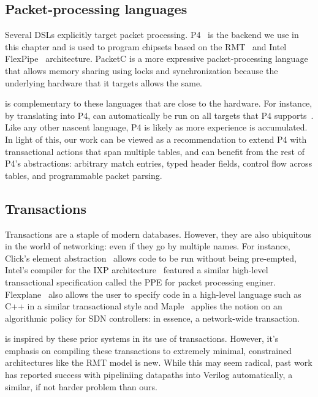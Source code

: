 \subsection{Packet-processing languages}
Several DSLs explicitly target packet processing. P4~\cite{p4} is the backend
we use in this chapter and is used to program chipsets based on the
RMT~\cite{rmt} and Intel FlexPipe~\cite{flexpipe} architecture. PacketC is a
more expressive packet-processing language that allows memory sharing using
locks and synchronization because the underlying hardware that it targets
allows the same.

\pktlanguage{} is complementary to these languages that are close to the
hardware. For instance, by translating into P4, \pktlanguage{} can automatically be
run on all targets that P4 supports~\cite{lavanya_compiler}. Like any other
nascent language, P4 is likely as more experience is accumulated. In light of
this, our work can be viewed as a recommendation to extend P4 with
transactional actions that span multiple tables, and can benefit from the rest
of P4's abstractions: arbitrary match entries, typed header fields, control
flow across tables, and programmable packet parsing.

\subsection{Transactions}
Transactions are a staple of modern databases. However, they are also
ubiquitous in the world of networking: even if they go by multiple names. For
instance, Click's element abstraction~\cite{click} allows code to be run
without being pre-empted, Intel's compiler for the IXP
architecture~\cite{intel} featured a similar high-level transactional
specification called the PPE for packet processing enginer.
Flexplane~\cite{flexplane} also allows the user to specify code in a high-level
language such as C++ in a similar transactional style and Maple~\cite{maple}
applies the notion on an algorithmic policy for SDN controllers: in essence,
a network-wide transaction.

 \pktlanguage{} is inspired by these prior systems in its use of transactions.
However, it's emphasis on compiling these transactions to extremely minimal,
constrained architectures like the RMT model is new. While this may seem
radical, past work has reported success with pipeliniing datapaths into Verilog
automatically, a similar, if not harder problem than ours.
